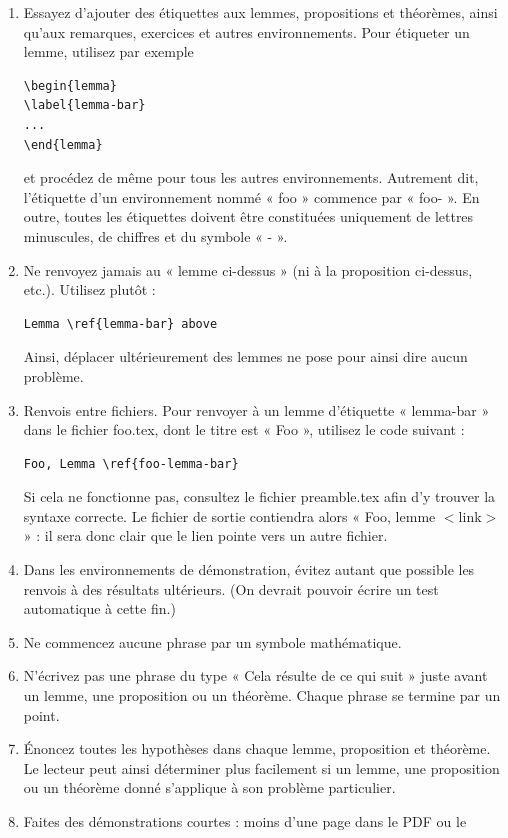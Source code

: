 \begin{enumerate}
\begin{verbatim}
\end{verbatim}
\item Essayez d'ajouter des étiquettes aux lemmes, propositions et théorèmes,
ainsi qu'aux remarques, exercices et autres environnements. Pour étiqueter un
lemme, utilisez par exemple
\begin{verbatim}
\begin{lemma}
\label{lemma-bar}
...
\end{lemma}
\end{verbatim}
et procédez de même pour tous les autres environnements. Autrement dit,
l'étiquette d'un environnement nommé « foo » commence par « foo- ».
En outre, toutes les étiquettes doivent être constituées uniquement de lettres
minuscules, de chiffres et du symbole « - ».
\item Ne renvoyez jamais au « lemme ci-dessus » (ni à la proposition
ci-dessus, etc.). Utilisez plutôt :
\begin{verbatim}
Lemma \ref{lemma-bar} above
\end{verbatim}
Ainsi, déplacer ultérieurement des lemmes ne pose pour ainsi dire aucun
problème.
\item Renvois entre fichiers. Pour renvoyer à un lemme d'étiquette
« lemma-bar » dans le fichier foo.tex, dont le titre est « Foo », utilisez le
code suivant :
\begin{verbatim}
Foo, Lemma \ref{foo-lemma-bar}
\end{verbatim}
Si cela ne fonctionne pas, consultez le fichier preamble.tex afin d'y trouver
la syntaxe correcte. Le fichier de sortie contiendra alors
« Foo, lemme $<$link$>$ » : il sera donc clair que le lien pointe vers un autre
fichier.
\item Dans les environnements de démonstration, évitez autant que possible les
renvois à des résultats ultérieurs. (On devrait pouvoir écrire un test
automatique à cette fin.)
\item Ne commencez aucune phrase par un symbole mathématique.
\item N'écrivez pas une phrase du type « Cela résulte de ce qui suit » juste
avant un lemme, une proposition ou un théorème. Chaque phrase se termine par
un point.
\item Énoncez toutes les hypothèses dans chaque lemme, proposition et théorème.
Le lecteur peut ainsi déterminer plus facilement si un lemme, une proposition
ou un théorème donné s'applique à son problème particulier.
\item Faites des démonstrations courtes : moins d'une page dans le PDF ou le

\end{enumerate}
